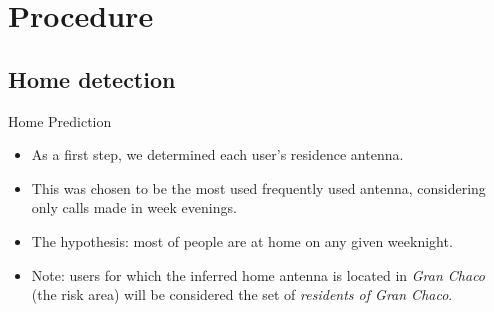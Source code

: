 
\section{Procedure}
\subsection{Home detection}
	\begin{block}{Home Prediction}
		\begin{itemize}
			\item As a first step, we determined each user's residence antenna.
			
			\item This was chosen to be the most used frequently used antenna, considering only calls made in week evenings.
			
			\item The hypothesis: most of people are at home on any given weeknight. 

			\item Note: users for which the inferred home antenna is located in \textit{Gran Chaco} (the risk area) will
			be considered the set of \textit{residents of Gran Chaco}. 
			
		\end{itemize}
	\end{block}

